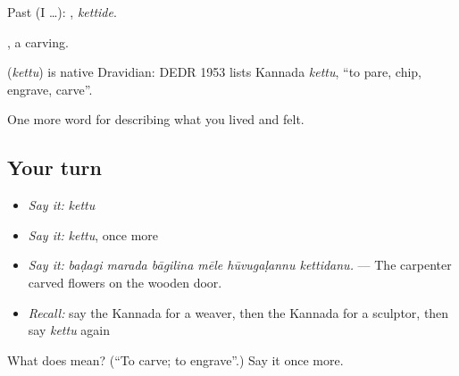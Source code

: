 Past (I …): , \emph{kettide}.

, a carving.

\begin{cousinweb}
\textbf{} (\emph{kettu}) is native Dravidian: DEDR 1953 lists Kannada \emph{kettu}, \textquotedblleft{}to pare, chip, engrave, carve\textquotedblright{}.
\end{cousinweb}

\begin{grammarlens}[title={What you've built}]
One more word for describing what you lived and felt.
\end{grammarlens}

\subsection*{Your turn}
\begin{itemize}
\raggedright
  \item \emph{Say it:} \emph{kettu}
  \item \emph{Say it:} \emph{kettu}, once more
  \item \emph{Say it:} \emph{baḍagi marada bāgilina mēle hūvugaḷannu kettidanu.} — The carpenter carved flowers on the wooden door.
  \item \emph{Recall:} say the Kannada for a weaver, then the Kannada for a sculptor, then say \emph{kettu} again
\end{itemize}

\begin{tcolorbox}[breakable,colback=teal!4,colframe=teal!35!black,title={Before you move on}]
What does  mean? (\textquotedblleft{}To carve; to engrave\textquotedblright{}.) Say it once more.
\end{tcolorbox}

